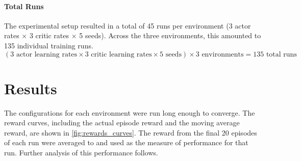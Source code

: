 \documentclass{article}
\begin{document}
\paragraph{Total Runs}
The experimental setup resulted in a total of 45 runs per environment (3 actor rates \(\times\) 3 critic rates \(\times\) 5 seeds). Across the three environments, this amounted to 135 individual training runs.
\[
(3 \text{ actor learning rates} \times 3 \text{ critic learning rates} \times 5 \text{ seeds}) \times 3 \text{ environments} = 135 \text{ total runs}
\]

\clearpage
\section{Results}

The configurations for each environment were run long enough to converge. The reward curves, including the actual episode reward and the moving average reward, are shown in  \autoref{fig:rewards_curves}. The reward from the final 20 episodes of each run were averaged to and used as the measure of performance for that run. Further analysis of this performance follows.
\end{document}

